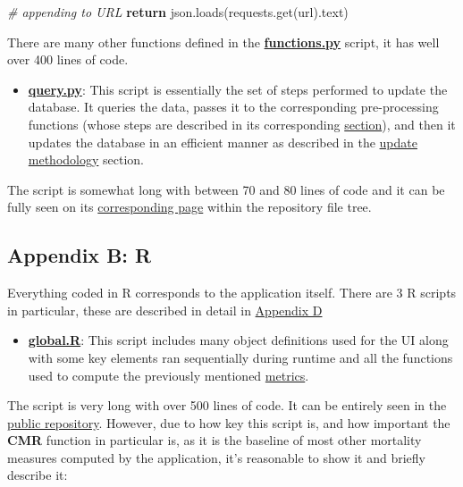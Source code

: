 \documentclass[
  a4paper]{article}
\newenvironment{Shaded}{\begin{snugshade}}{\end{snugshade}}
\newcommand{\CommentTok}[1]{\textcolor[rgb]{0.56,0.35,0.01}{\textit{#1}}}
\newcommand{\ControlFlowTok}[1]{\textcolor[rgb]{0.13,0.29,0.53}{\textbf{#1}}}
\newcommand{\NormalTok}[1]{#1}
\providecommand{\tightlist}{%
  \setlength{\itemsep}{0pt}\setlength{\parskip}{0pt}}
\begin{document}
\begin{Shaded}
\begin{Highlighting}[]
    \CommentTok{\# appending to URL}
    \ControlFlowTok{return}\NormalTok{ json.loads(requests.get(url).text)}
\end{Highlighting}
\end{Shaded}

\normalsize

There are many other functions defined in the
\href{https://github.com/dreth/tfm_uc3m/blob/main/api/functions.py}{\textbf{functions.py}}
script, it has well over 400 lines of code.

\begin{itemize}
\tightlist
\item
  \href{https://github.com/dreth/tfm_uc3m/blob/main/api/query.py}{\textbf{query.py}}:
  This script is essentially the set of steps performed to update the
  database. It queries the data, passes it to the corresponding
  pre-processing functions (whose steps are described in its
  corresponding \protect\hyperlink{PreProcessingPipeline}{section}), and
  then it updates the database in an efficient manner as described in
  the \protect\hyperlink{DatasetUpdateMethodology}{update methodology}
  section.
\end{itemize}

The script is somewhat long with between 70 and 80 lines of code and it
can be fully seen on its
\href{https://github.com/dreth/tfm_uc3m/blob/main/api/query.py}{corresponding
page} within the repository file tree.

\hypertarget{appendix-b-r}{%
\subsection{Appendix B: R}\label{appendix-b-r}}

Everything coded in R corresponds to the application itself. There are 3
R scripts in particular, these are described in detail in
\protect\hyperlink{AppendixD}{Appendix D}

\begin{itemize}
\tightlist
\item
  \href{https://github.com/dreth/tfm_uc3m/blob/main/dashboard/global.R}{\textbf{global.R}}:
  This script includes many object definitions used for the UI along
  with some key elements ran sequentially during runtime and all the
  functions used to compute the previously mentioned
  \protect\hyperlink{Metrics}{metrics}.
\end{itemize}

The script is very long with over 500 lines of code. It can be entirely
seen in the
\href{https://github.com/dreth/tfm_uc3m/blob/main/dashboard/global.R}{public
repository}. However, due to how key this script is, and how important
the \textbf{CMR} function in particular is, as it is the baseline of
most other mortality measures computed by the application, it's
reasonable to show it and briefly describe it:
\end{document}
